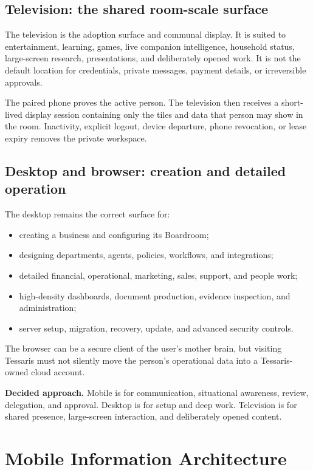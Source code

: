 \documentclass[11pt,a4paper]{article}
\newcommand{\decision}[1]{%
  \par\medskip\noindent
  \colorbox{pilotblue!9}{\parbox{0.94\linewidth}{\textbf{Decided approach.} #1}}%
  \par\medskip}
\begin{document}
\subsection{Television: the shared room-scale surface}

The television is the adoption surface and communal display.  It is suited to
entertainment, learning, games, live companion intelligence, household status,
large-screen research, presentations, and deliberately opened work.  It is not
the default location for credentials, private messages, payment details, or
irreversible approvals.

The paired phone proves the active person.  The television then receives a
short-lived display session containing only the tiles and data that person may
show in the room.  Inactivity, explicit logout, device departure, phone
revocation, or lease expiry removes the private workspace.

\subsection{Desktop and browser: creation and detailed operation}

The desktop remains the correct surface for:

\begin{itemize}[leftmargin=*]
  \item creating a business and configuring its Boardroom;
  \item designing departments, agents, policies, workflows, and integrations;
  \item detailed financial, operational, marketing, sales, support, and people work;
  \item high-density dashboards, document production, evidence inspection, and administration;
  \item server setup, migration, recovery, update, and advanced security controls.
\end{itemize}

The browser can be a secure client of the user's mother brain, but visiting
Tessaris must not silently move the person's operational data into a
Tessaris-owned cloud account.

\decision{Mobile is for communication, situational awareness, review,
delegation, and approval.  Desktop is for setup and deep work.  Television is
for shared presence, large-screen interaction, and deliberately opened
content.}

\section{Mobile Information Architecture}
\end{document}
